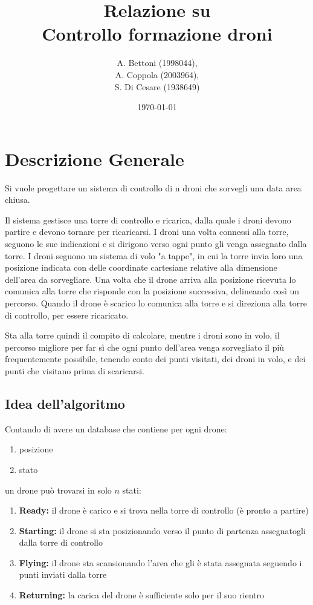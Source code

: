 \documentclass[a4paper, 12pt]{report}
\title{Relazione su \\
Controllo formazione droni}
\author{A. Bettoni (1998044),\\ A. Coppola (2003964),\\S. Di Cesare (1938649)}
\date{\today}
\begin{document}
\maketitle
\newpage
\tableofcontents
\newpage
\chapter{Descrizione Generale}
Si vuole progettare un sistema di controllo di n droni che sorvegli una data area chiusa.

Il sistema gestisce una torre di controllo e ricarica, dalla quale i droni devono partire e devono tornare per ricaricarsi. 
I droni una volta connessi alla torre, seguono le sue indicazioni e si dirigono verso ogni punto gli venga assegnato dalla torre.
I droni seguono un sistema di volo "a tappe", in cui la torre invia loro una posizione indicata con delle coordinate cartesiane
relative alla dimensione dell'area da sorvegliare. Una volta che il drone arriva alla posizione ricevuta lo comunica alla torre che risponde con la posizione successiva, delineando così un percorso.
Quando il drone è scarico lo comunica alla torre e si direziona alla torre di controllo, per essere ricaricato.

Sta alla torre quindi il compito di calcolare, mentre i droni sono in volo, il percorso migliore per far sì che ogni punto dell'area venga sorvegliato 
il più frequentemente possibile, tenendo conto dei punti visitati, dei droni in volo, e dei punti che visitano prima di scaricarsi.

\section{Idea dell'algoritmo}
Contando di avere un database che contiene per ogni drone:
\begin{enumerate}
    \item posizione
    \item stato
\end{enumerate}

un drone può trovarsi in solo $n$ stati:
\begin{enumerate}
    \item \textbf{Ready:} il drone è carico e si trova nella torre di controllo (è pronto a partire)
    \item \textbf{Starting:} il drone si sta posizionando verso il punto di partenza assegnatogli dalla torre di controllo
    \item \textbf{Flying:} il drone sta scansionando l'area che gli è stata assegnata seguendo i punti inviati dalla torre
    \item \textbf{Returning:} la carica del drone è sufficiente solo per il suo rientro 
\end{enumerate}
\end{document}
